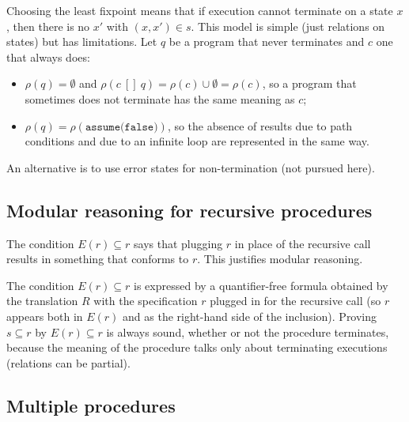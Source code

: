 Choosing the least fixpoint means that if execution cannot terminate on a state $x$, then there is no $x'$ with $(x, x') \in s$. This model is simple (just relations on states) but has limitations. Let $q$ be a program that never terminates and $c$ one that always does:
\begin{itemize}
  \item $\rho(q) = \emptyset$ and $\rho(c\ [\!]\ q) = \rho(c) \cup \emptyset = \rho(c)$, so a program that sometimes does not terminate has the same meaning as $c$;
  \item $\rho(q) = \rho(\texttt{assume(false)})$, so the absence of results due to path conditions and due to an infinite loop are represented in the same way.
\end{itemize}
An alternative is to use error states for non-termination (not pursued here).
 
\subsection*{Modular reasoning for recursive procedures}
 
The condition $E(r) \subseteq r$ says that plugging $r$ in place of the recursive call results in something that conforms to $r$. This justifies modular reasoning.
 
 
 
The condition $E(r) \subseteq r$ is expressed by a quantifier-free formula obtained by the translation $R$ with the specification $r$ plugged in for the recursive call (so $r$ appears both in $E(r)$ and as the right-hand side of the inclusion). Proving $s \subseteq r$ by $E(r) \subseteq r$ is always sound, whether or not the procedure terminates, because the meaning of the procedure talks only about terminating executions (relations can be partial).
 
\subsection*{Multiple procedures}
 
